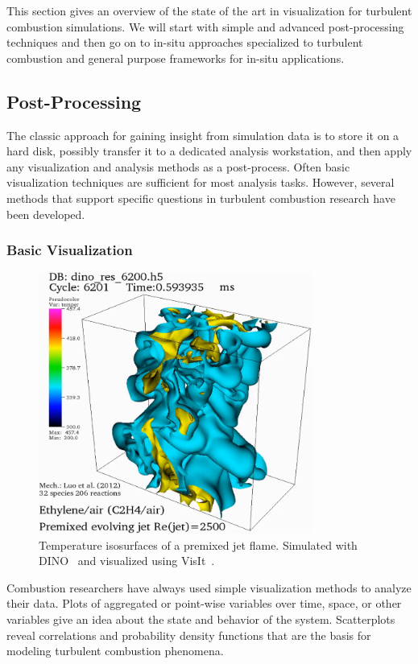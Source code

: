 %
This section gives an overview of the state of the art in visualization for
turbulent combustion simulations.
%
We will start with simple and advanced post-processing techniques and then go on
to in-situ approaches specialized to turbulent combustion and general purpose
frameworks for in-situ applications.
%
%
\subsection{Post-Processing} %
\label{sub:post_processing}
%
The classic approach for gaining insight from simulation data is to store it on
a hard disk, possibly transfer it to a dedicated analysis workstation, and then
apply any visualization and analysis methods as a post-process.
%
Often basic visualization techniques are sufficient for most analysis tasks.
%
However, several methods that support specific questions in turbulent combustion
research have been developed.
%
\subsubsection{Basic Visualization} %
\label{ssub:basic_visualization}
%
\begin{figure}[t]
    \centering
    \includegraphics[width=0.8\textwidth]{figures/visit_isosurface.png}
    \caption{Temperature isosurfaces of a premixed jet flame.
        Simulated with DINO~\cite{Abdelsamie2016} and visualized using
        VisIt~\cite{HPV:VisIt}.}
    \label{fig:visit_isosurface}
\end{figure}
%
Combustion researchers have always used simple visualization methods to analyze
their data.
%
Plots of aggregated or point-wise variables over time, space, or other variables
give an idea about the state and behavior of the system.
%
Scatterplots reveal correlations and probability density functions that are the
basis for modeling turbulent combustion phenomena.
%

